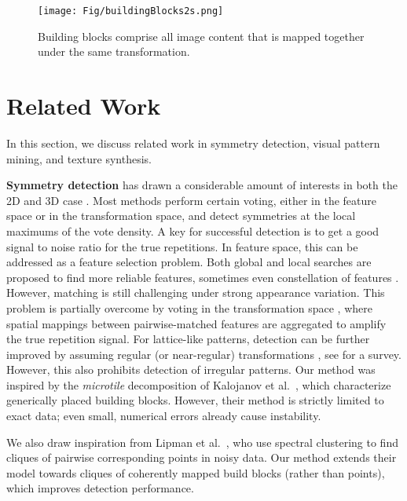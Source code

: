 \documentclass{acmtog}
\begin{document}
\begin{figure}
	\centering
		\texttt{[image: Fig/buildingBlocks2s.png]}
	\caption{Building blocks comprise all image content that is mapped together under the same transformation.}
	\label{fig:buildingBlocks}
\end{figure}

\section{Related Work}
\label{sec:RelatedWork}

In this section, we discuss related work in symmetry detection, visual pattern mining, and texture synthesis.

\textbf{Symmetry detection} has drawn a considerable amount of interests in both the 2D \cite{Lee2009SR,Wu2010DL} and 3D case \cite{Mitra2006PAA,Pauly2008,LIPMANsig2010,HuangMesh2013}. Most methods perform certain voting, either in the feature space or in the transformation space, and detect symmetries at the local maximums of the vote density. A key for successful detection is to get a good signal to noise ratio for the true repetitions. In feature space, this can be addressed as a feature selection problem. Both global \cite{Wang2008Factor,Agrawal2012RI,Bokeloh2009SD} and local \cite{Leung1996} searches are proposed to find more reliable features, sometimes even constellation of features \cite{Liu2013GRASP}.
%
However, matching is still challenging under strong appearance variation. This problem is partially overcome by voting in the transformation space \cite{Hays2006Texture,Mitra2006PAA}, where spatial mappings between pairwise-matched features are aggregated to amplify the true repetition signal. For lattice-like patterns, detection can be further improved by assuming regular (or near-regular) transformations \cite{Pauly2008,Wu2010DL,Zhao2011TS,Tai2012PF}, see \cite{Lin2006Eva} for a survey.
%
However, this also prohibits detection of irregular patterns. Our method was inspired by the \emph{microtile} decomposition of Kalojanov et al.~, which characterize generically placed building blocks. However, their method is strictly limited to exact data; even small, numerical errors already cause instability.

We also draw inspiration from Lipman et al.~\cite{LIPMANsig2010}, who use spectral clustering to find cliques of pairwise corresponding points in noisy data. Our method extends their model towards cliques of coherently mapped build blocks (rather than points), which improves detection performance.
\end{document}
